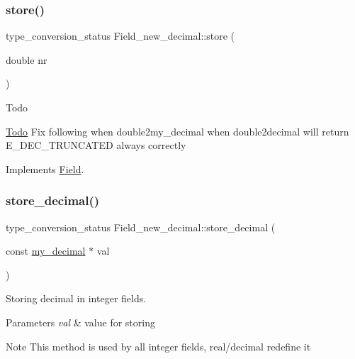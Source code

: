 \subsubsection{\texorpdfstring{store()}{store()}}
{\footnotesize\ttfamily type\+\_\+conversion\+\_\+status Field\+\_\+new\+\_\+decimal\+::store (\begin{DoxyParamCaption}\item[{double}]{nr }\end{DoxyParamCaption})\hspace{0.3cm}{\ttfamily [virtual]}}

\begin{DoxyRefDesc}{Todo}
\item[\mbox{\hyperlink{todo__todo000012}{Todo}}]Fix following when double2my\+\_\+decimal when double2decimal will return E\+\_\+\+D\+E\+C\+\_\+\+T\+R\+U\+N\+C\+A\+T\+ED always correctly \end{DoxyRefDesc}


Implements \mbox{\hyperlink{classField}{Field}}.

\mbox{\label{classField__new__decimal_a15580620890eb78ffde70b2f54ad684f}} 
\subsubsection{\texorpdfstring{store\+\_\+decimal()}{store\_decimal()}}
{\footnotesize\ttfamily type\+\_\+conversion\+\_\+status Field\+\_\+new\+\_\+decimal\+::store\+\_\+decimal (\begin{DoxyParamCaption}\item[{const \mbox{\hyperlink{classmy__decimal}{my\+\_\+decimal}} $\ast$}]{val }\end{DoxyParamCaption})\hspace{0.3cm}{\ttfamily [virtual]}}

Storing decimal in integer fields.


\begin{DoxyParams}{Parameters}
{\em val} & value for storing\\
\hline
\end{DoxyParams}
\begin{DoxyNote}{Note}
This method is used by all integer fields, real/decimal redefine it
\end{DoxyNote}

